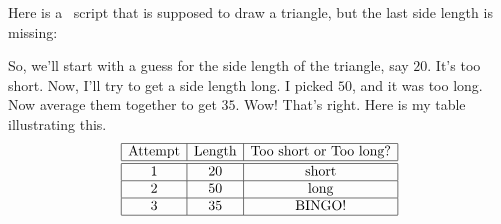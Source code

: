 \documentclass[handout,nooutcomes,noauthor]{ximera}
\begin{document}
\begin{question}
  Here is a \snap\ script that is supposed to draw a triangle, but the
  last side length is missing:
  
  \begin{freeResponse}
    So, we'll start with a guess for the side length of the triangle,
    say $20$. It's too short. Now, I'll try to get a side length
    long. I picked $50$, and it was too long. Now average them
    together to get $35$. Wow! That's right.  Here is my table
    illustrating this.
    \[
  \begin{array}{|c|c|c|c|}\hline
    \text{Attempt} & \text{Length} & \text{Too short or Too long?} \\ \hline\hline
    1 & 20 & \text{short} \\ \hline
    2 & 50 & \text{long} \\ \hline
    3 & 35 & \text{BINGO!} \\ \hline
  \end{array}
  \]
\end{freeResponse}
\end{question}
\mynewpage
\end{document}
